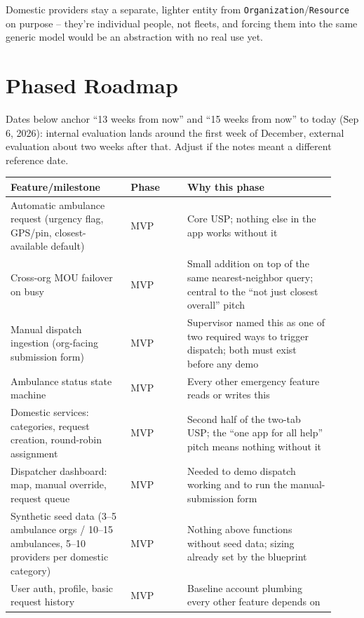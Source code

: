 \documentclass[11pt,a4paper]{article}
\begin{document}
Domestic providers stay a separate, lighter entity from \texttt{Organization}/\texttt{Resource} on purpose -- they're individual people, not fleets, and forcing them into the same generic model would be an abstraction with no real use yet.

\section{Phased Roadmap}

Dates below anchor ``13 weeks from now'' and ``15 weeks from now'' to today (Sep 6, 2026): internal evaluation lands around the first week of December, external evaluation about two weeks after that. Adjust if the notes meant a different reference date.

\begin{longtable}{p{0.34\linewidth} p{0.16\linewidth} p{0.42\linewidth}}
\toprule
\textbf{Feature/milestone} & \textbf{Phase} & \textbf{Why this phase} \\
\midrule
\endhead
Automatic ambulance request (urgency flag, GPS/pin, closest-available default) & MVP & Core USP; nothing else in the app works without it \\
\addlinespace
Cross-org MOU failover on busy & MVP & Small addition on top of the same nearest-neighbor query; central to the ``not just closest overall'' pitch \\
\addlinespace
Manual dispatch ingestion (org-facing submission form) & MVP & Supervisor named this as one of two required ways to trigger dispatch; both must exist before any demo \\
\addlinespace
Ambulance status state machine & MVP & Every other emergency feature reads or writes this \\
\addlinespace
Domestic services: categories, request creation, round-robin assignment & MVP & Second half of the two-tab USP; the ``one app for all help'' pitch means nothing without it \\
\addlinespace
Dispatcher dashboard: map, manual override, request queue & MVP & Needed to demo dispatch working and to run the manual-submission form \\
\addlinespace
Synthetic seed data (3--5 ambulance orgs / 10--15 ambulances, 5--10 providers per domestic category) & MVP & Nothing above functions without seed data; sizing already set by the blueprint \\
\addlinespace
User auth, profile, basic request history & MVP & Baseline account plumbing every other feature depends on \\

\end{longtable}
\end{document}
